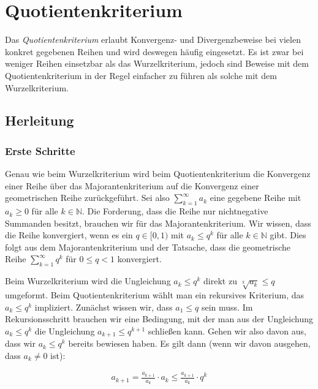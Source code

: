 \documentclass[fontsize=9pt,
               parskip=half-,
               DIV=14,
               listof=chapterentry,
               tocflat]{scrbook}
\begin{document}
\chapter{Quotientenkriterium}

Das \emph{Quotientenkriterium} erlaubt Konvergenz- und Divergenzbeweise bei vielen konkret gegebenen Reihen und wird deswegen häufig eingesetzt. Es ist zwar bei weniger Reihen einsetzbar als das Wurzelkriterium, jedoch sind Beweise mit dem Quotientenkriterium in der Regel einfacher zu führen als solche mit dem Wurzelkriterium.



\section{Herleitung}

\subsection{Erste Schritte}

Genau wie beim Wurzelkriterium wird beim Quotientenkriterium die Konvergenz einer Reihe über das Majorantenkriterium auf die Konvergenz einer geometrischen Reihe zurückgeführt. Sei also $\sum _{k=1}^{\infty }a_{k}$ eine gegebene Reihe mit $a_{k}\geq 0$ für alle $k\in \mathbb {N} $. Die Forderung, dass die Reihe nur nichtnegative Summanden besitzt, brauchen wir für das Majorantenkriterium. Wir wissen, dass die Reihe konvergiert, wenn es ein $q\in [0,1)$ mit $a_{k}\leq q^{k}$ für alle $k\in \mathbb {N} $ gibt. Dies folgt aus dem Majorantenkriterium und der Tatsache, dass die geometrische Reihe $\sum _{k=1}^{\infty }q^{k}$ für $0\leq q<1$ konvergiert.

Beim Wurzelkriterium wird die Ungleichung $a_{k}\leq q^{k}$ direkt zu ${\sqrt[{k}]{a_{k}}}\leq q$ umgeformt. Beim Quotientenkriterium wählt man ein rekursives Kriterium, das $a_{k}\leq q^{k}$ impliziert. Zunächst wissen wir, dass $a_{1}\leq q$ sein muss. Im Rekursionsschritt brauchen wir eine Bedingung, mit der man aus der Ungleichung $a_{k}\leq q^{k}$ die Ungleichung $a_{k+1}\leq q^{k+1}$ schließen kann. Gehen wir also davon aus, dass wir $a_{k}\leq q^{k}$ bereits bewiesen haben. Es gilt dann (wenn wir davon ausgehen, dass $a_{k}\neq 0$ ist):

\begin{align*}
a_{k+1}={\frac {a_{k+1}}{a_{k}}}\cdot a_{k}\leq {\frac {a_{k+1}}{a_{k}}}\cdot q^{k}
\end{align*}
\end{document}

